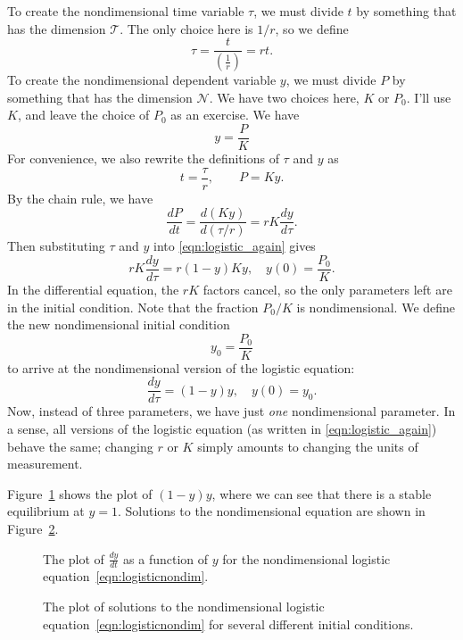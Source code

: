 \documentclass[reqno]{immbook}
\numberwithin{equation}{chapter}
\numberwithin{question}{section}
\numberwithin{theorem}{chapter}
\numberwithin{figure}{chapter}
\theoremstyle{definition}
\begin{document}
To create the nondimensional time variable $\tau$, we must
divide $t$ by something that has the dimension $\mathcal{T}$.
The only choice here is $1/r$, so
we define
\begin{equation}
  \tau = \frac{t}{\left(\frac{1}{r}\right)} = rt.
\end{equation}
To create the nondimensional dependent variable $y$, we must
divide $P$ by something that has the dimension $\mathcal{N}$.
We have two choices here, $K$ or $P_0$.
I'll use $K$, and leave the choice of $P_0$ as an exercise.
We have
\begin{equation}
   y=\frac{P}{K}
\end{equation}
For convenience, we also rewrite the definitions of
$\tau$ and $y$ as
\begin{equation}
  t = \frac{\tau}{r}, \quad\quad P = Ky.
\end{equation}
By the chain rule, we have
\begin{equation}
  \frac{dP}{dt} = \frac{d(Ky)}{d(\tau/r)}
    = rK\frac{dy}{d\tau}.
  \label{eqn:chainrule}
\end{equation}
Then substituting $\tau$ and $y$ into
\eqref{eqn:logistic_again}
gives
\begin{equation}
  rK\frac{dy}{d\tau} = r (1-y)Ky,  \quad y(0) = \frac{P_0}{K}.
\end{equation}
In the differential equation, the $rK$ factors cancel, so the only
parameters left are in the initial condition.
Note that the fraction $P_0/K$ is nondimensional.
We define the new nondimensional initial condition
\begin{equation}
   y_0 = \frac{P_0}{K}
\end{equation}
to arrive at the nondimensional version of the logistic equation:
\begin{equation}
  \frac{dy}{d\tau} = (1-y)y, \quad  y(0) = y_0.
\label{eqn:logisticnondim}
\end{equation}
Now, instead of three parameters, we have just \emph{one}
nondimensional parameter.
In a sense, all versions of the logistic equation
(as written in \eqref{eqn:logistic_again})
behave the same; changing $r$ or $K$ simply amounts to
changing the units of measurement.

Figure~\ref{fig:logisticplot} shows the plot of $(1-y)y$, where we can see
that there is a stable equilibrium at $y=1$.
Solutions to the nondimensional equation are shown
in Figure~\ref{fig:logisticsolutionsplot}.
\begin{figure}
\centerline{%
\framebox{%
\parbox{5.5in}{%

}}}
\caption{The plot of $\frac{dy}{dt}$ as a function of $y$
for the nondimensional logistic equation~\eqref{eqn:logisticnondim}.}
\label{fig:logisticplot}
\end{figure}
\begin{figure}
\centerline{%
\framebox{%
\parbox{5.5in}{%

}}}
\caption{The plot of solutions to the nondimensional
logistic equation~\eqref{eqn:logisticnondim} for several different
initial conditions.}
\label{fig:logisticsolutionsplot}
\end{figure}
\end{document}
